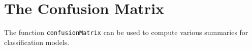 \documentclass[caret-main.tex]{subfiles}
\begin{document}
\newpage
\section{The Confusion Matrix}
The function \texttt{confusionMatrix} can be used to compute various summaries for classification
models.
\end{document}
